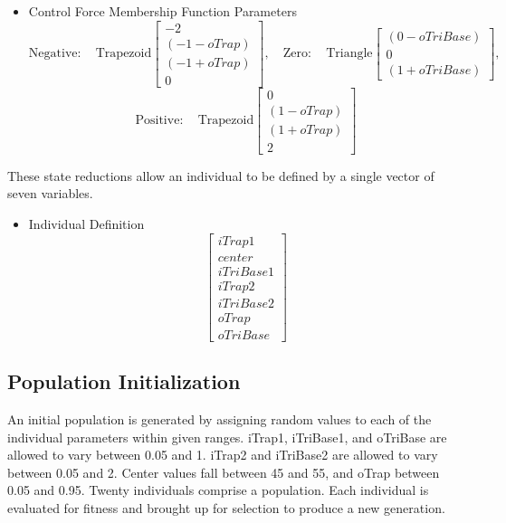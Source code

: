 \begin{itemize}
\item Control Force Membership Function Parameters \begin{displaymath} \mathrm{Negative:}\quad
    \mathrm{Trapezoid}\begin{bmatrix} -2\\ (-1-oTrap)\\ (-1+oTrap)\\0 \end{bmatrix}, \quad \mathrm{Zero:}\quad
    \mathrm{Triangle}\begin{bmatrix} (0-oTriBase)\\0\\ (1+oTriBase) \end{bmatrix}, \end{displaymath}
        \begin{displaymath} \mathrm{Positive:}\quad \mathrm{Trapezoid}\begin{bmatrix} 0\\ (1-oTrap)\\
    (1+oTrap)\\2 \end{bmatrix} \end{displaymath} \end{itemize}
 
These state reductions allow an individual to be defined by a single vector of seven variables.
\begin{itemize} \item Individual Definition \begin{displaymath} \begin{bmatrix} iTrap1\\ center\\ iTriBase1\\
iTrap2 \\iTriBase2 \\oTrap \\oTriBase \end{bmatrix} \end{displaymath} \end{itemize}
 
\subsection{Population Initialization} An initial population is generated by assigning random values to each
of the individual parameters within given ranges. iTrap1, iTriBase1, and oTriBase are allowed to vary between
0.05 and 1. iTrap2 and iTriBase2 are allowed to vary between 0.05 and 2. Center values fall between 45 and 55,
and oTrap between 0.05 and 0.95. Twenty individuals comprise a population. Each individual is evaluated for
fitness and brought up for selection to produce a new generation.

